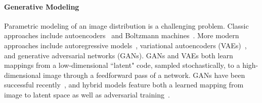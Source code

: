 \paragraph{Generative Modeling} Parametric modeling of an image distribution is a challenging problem. Classic approaches include autoencoders~\cite{hinton2006reducing,vincent2008extracting} and Boltzmann machines~\cite{smolensky1986information}. More modern approaches include autoregressive models~\cite{efros1999texture,van2016conditional}, variational autoencoders (VAEs)~\cite{kingma2013auto}, and generative adversarial networks (GANs). GANs and VAEs both learn mappings from a low-dimensional ``latent" code, sampled stochastically, to a high-dimensional image through a feedforward pass of a network. GANs have been successful recently~\cite{denton2015deep,radford2015unsupervised,arjovsky2017wgan}, and hybrid models feature both a learned mapping from image to latent space as well as adversarial training~\cite{donahue2016adversarial,dumoulin2016adversarially,larsen2016vaegan,chen2016infogan}.

